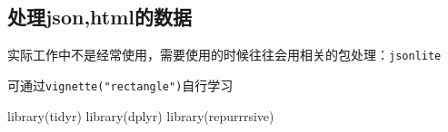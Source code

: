 \documentclass[
]{book}
\newenvironment{Shaded}{\begin{snugshade}}{\end{snugshade}}
\newcommand{\FunctionTok}[1]{\textcolor[rgb]{0.00,0.00,0.00}{#1}}
\newcommand{\NormalTok}[1]{#1}
\begin{document}
\hypertarget{ux5904ux7406jsonhtmlux7684ux6570ux636e}{%
\subsection{处理json,html的数据}\label{ux5904ux7406jsonhtmlux7684ux6570ux636e}}

实际工作中不是经常使用，需要使用的时候往往会用相关的包处理：\texttt{jsonlite}

可通过\texttt{vignette("rectangle")}自行学习

\begin{Shaded}
\begin{Highlighting}[]
\FunctionTok{library}\NormalTok{(tidyr)}
\FunctionTok{library}\NormalTok{(dplyr)}
\FunctionTok{library}\NormalTok{(repurrrsive)}
\end{Highlighting}
\end{Shaded}
\end{document}
